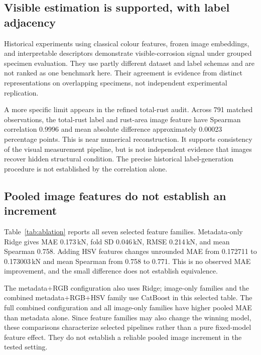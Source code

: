 \documentclass[conference]{IEEEtran}
\newcommand{\shared}{../..}
\begin{document}
\subsection{Visible estimation is supported, with label adjacency}
Historical experiments using classical colour features, frozen image embeddings, and interpretable descriptors demonstrate visible-corrosion signal under grouped specimen evaluation. They use partly different dataset and label schemas and are not ranked as one benchmark here. Their agreement is evidence from distinct representations on overlapping specimens, not independent experimental replication.

A more specific limit appears in the refined total-rust audit. Across 791 matched observations, the total-rust label and rust-area image feature have Spearman correlation 0.9996 and mean absolute difference approximately 0.00023 percentage points. This is near numerical reconstruction. It supports consistency of the visual measurement pipeline, but is not independent evidence that images recover hidden structural condition. The precise historical label-generation procedure is not established by the correlation alone.

\subsection{Pooled image features do not establish an increment}
Table~\ref{tab:ablation} reports all seven selected feature families. Metadata-only Ridge gives MAE 0.173\,kN, fold SD 0.046\,kN, RMSE 0.214\,kN, and mean Spearman 0.758. Adding HSV features changes unrounded MAE from 0.172711 to 0.173003\,kN and mean Spearman from 0.758 to 0.771. This is no observed MAE improvement, and the small difference does not establish equivalence.
\begin{table}[t]\centering
\caption{Pooled terminal-load results: 48 specimens, ten grouped folds. MAE and sample fold SD are in kN; $R^2$ and $\rho$ are mean fold metrics. The same folds select and score the displayed configurations.}\label{tab:ablation}
\footnotesize
\end{table}

The metadata+RGB configuration also uses Ridge; image-only families and the combined metadata+RGB+HSV family use CatBoost in this selected table. The full combined configuration and all image-only families have higher pooled MAE than metadata alone. Since feature families may also change the winning model, these comparisons characterize selected pipelines rather than a pure fixed-model feature effect. They do not establish a reliable pooled image increment in the tested setting.
\end{document}
